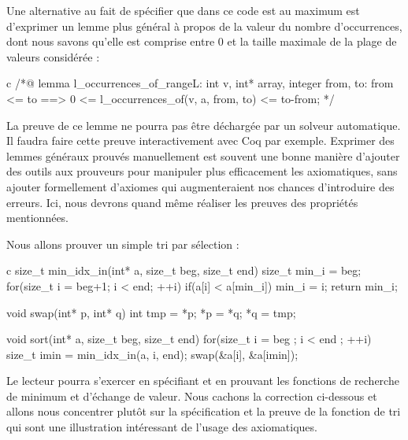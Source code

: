 \documentclass[middle]{zmdocument}
\begin{document}
Une alternative au fait de spécifier que dans ce code  est au 
maximum  est d'exprimer un lemme plus général à propos de la valeur
du nombre d'occurrences, dont nous savons qu'elle est comprise entre 0 et 
la taille maximale de la plage de valeurs considérée :



\begin{CodeBlock}{c}
/*@
lemma l_occurrences_of_range{L}:
  \forall int v, int* array, integer from, to:
    from <= to ==> 0 <= l_occurrences_of(v, a, from, to) <= to-from;
*/
\end{CodeBlock}



La preuve de ce lemme ne pourra pas être déchargée par un solveur automatique. Il
faudra faire cette preuve interactivement avec Coq par exemple. Exprimer des 
lemmes généraux prouvés manuellement est souvent une bonne manière d'ajouter des
outils aux prouveurs pour manipuler plus efficacement les axiomatiques, sans 
ajouter formellement d'axiomes qui augmenteraient nos chances d'introduire des
erreurs. Ici, nous devrons quand même réaliser les preuves des propriétés 
mentionnées.





Nous allons prouver un simple tri par sélection :



\begin{CodeBlock}{c}
size_t min_idx_in(int* a, size_t beg, size_t end){
  size_t min_i = beg;
  for(size_t i = beg+1; i < end; ++i)
    if(a[i] < a[min_i]) min_i = i;
  return min_i;
}

void swap(int* p, int* q){
  int tmp = *p; *p = *q; *q = tmp;
}

void sort(int* a, size_t beg, size_t end){
  for(size_t i = beg ; i < end ; ++i){
    size_t imin = min_idx_in(a, i, end);
    swap(&a[i], &a[imin]);
  }
}
\end{CodeBlock}



Le lecteur pourra s'exercer en spécifiant et en prouvant les fonctions de 
recherche de minimum et d'échange de valeur. Nous cachons la correction 
ci-dessous et allons nous concentrer plutôt sur la spécification et la preuve de
la fonction de tri qui sont une illustration intéressant de l'usage des
axiomatiques.
\end{document}
